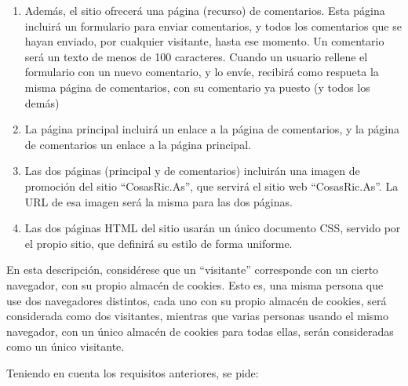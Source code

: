 \begin{enumerate}
\item Además, el sitio ofrecerá una página (recurso) de comentarios. Esta página incluirá un formulario para enviar comentarios, y todos los comentarios que se hayan enviado, por cualquier visitante, hasta ese momento. Un comentario será un texto de menos de 100 caracteres. Cuando un usuario rellene el formulario con un nuevo comentario, y lo envíe, recibirá como respueta la misma página de comentarios, con su comentario ya puesto (y todos los demás)

\item La página principal incluirá un enlace a la página de comentarios, y la página de comentarios un enlace a la página principal.

\item Las dos páginas (principal y de comentarios) incluirán una imagen de promoción del sitio ``CosasRic.As'', que servirá el sitio web ``CosasRic.As''. La URL de esa imagen será la misma para las dos páginas.
  
\item Las dos páginas HTML del sitio usarán un único documento CSS, servido por el propio sitio, que definirá su estilo de forma uniforme.
\end{enumerate}

En esta descripción, considérese que un ``visitante'' corresponde con un cierto navegador, con su propio almacén de cookies. Esto es, una misma persona que use dos navegadores distintos, cada uno con su propio almacén de cookies, será considerada como dos visitantes, mientras que varias personas usando el mismo navegador, con un único almacén de cookies para todas ellas, serán consideradas como un único visitante.

Teniendo en cuenta los requisitos anteriores, se pide:

